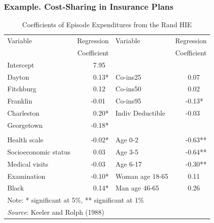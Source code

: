 \begin{frame}%
 \frametitle{Example. Cost-Sharing in Insurance Plans}
\begin{table}[h]
\caption{ Coefficients of Episode Expenditures from the Rand HIE}
\begin{tabular}{lr|lr}
   \hline
  Variable & Regression &   Variable & Regression \\
           & Coefficient &           & Coefficient \\
\hline
    Intercept &       7.95~ &            &            \\
    Dayton &       0.13* &    Co-ins25 &       0.07~~ \\
 Fitchburg &       0.12~ &    Co-ins50 &       0.02~~ \\
  Franklin &      -0.01~ &    Co-ins95 &      -0.13*~ \\
Charleston &       0.20* &    Indiv Deductible &      -0.03~~ \\
Georgetown &      -0.18* &            &            \\
           &            &            &            \\
Health scale &     -0.02* &    Age 0-2 &      -0.63** \\
Socioeconomic status &  0.03~ &    Age 3-5 &      -0.64** \\
Medical visits &      -0.03~ &   Age 6-17 &      -0.30** \\
Examination &      -0.10* & Woman age 18-65 &       0.11~~ \\
     Black &       0.14* & Man age 46-65 &       0.26~~ \\
 \hline
\multicolumn{4}{l}{Note: * significant at 5\%, ** significant at 1\%} \\
     \multicolumn{4}{l}{\textit{Source}: Keeler and Rolph (1988)} \\
      \hline
\end{tabular}
\end{table}

\end{frame}


